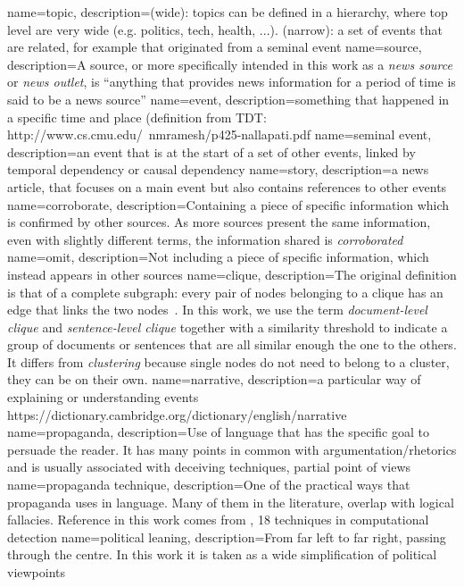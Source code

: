 
{
        name=topic,
        description={(wide): topics can be defined in a hierarchy, where top level are very wide (e.g. politics, tech, health, ...).
        (narrow): a set of events that are related, for example that originated from a seminal event}
}
{
        name=source,
        description={A source, or more specifically intended in this work as a \emph{news source} or \emph{news outlet}, is ``anything that provides news information for a period of time is said to be a news source''}
}
{
        name=event,
        description={something that happened in a specific time and place (definition from TDT: http://www.cs.cmu.edu/~nmramesh/p425-nallapati.pdf}
}
{
        name=seminal event,
        description={an event that is at the start of a set of other events, linked by temporal dependency or causal dependency}
}
{
        name=story,
        description={a news article, that focuses on a main event but also contains references to other events}
}
{
        name=corroborate,
        description={Containing a piece of specific information which is confirmed by other sources. As more sources present the same information, even with slightly different terms, the information shared is \emph{corroborated}}
}
{
        name=omit,
        description={Not including a piece of specific information, which instead appears in other sources}
}
{
        name=clique,
        description={The original definition is that of a complete subgraph: every pair of nodes belonging to a clique has an edge that links the two nodes~\citep{luce1949method}. In this work, we use the term \emph{document-level clique} and \emph{sentence-level clique} together with a similarity threshold to indicate a group of documents or sentences that are all similar enough the one to the others. It differs from \emph{clustering} because single nodes do not need to belong to a cluster, they can be on their own.}
}
{
        name=narrative,
        description={a particular way of explaining or understanding events 
            https://dictionary.cambridge.org/dictionary/english/narrative
        }
}
{
        name=propaganda,
        description={Use of language that has the specific goal to persuade the reader. It has many points in common with argumentation/rhetorics and is usually associated with deceiving techniques, partial point of views}
}
{
        name=propaganda technique,
        description={One of the practical ways that propaganda uses in language. Many of them in the literature, overlap with logical fallacies. Reference in this work comes from \cite{TODO}, 18 techniques in computational detection}
}
{
        name=political leaning,
        description={From far left to far right, passing through the centre. In this work it is taken as a wide simplification of political viewpoints}
}